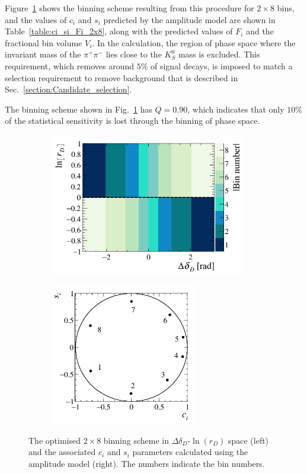 \documentclass[12pt, a4paper, notitlepage, onecolumn]{article}
\begin{document}
Figure~\ref{figure:Binning_scheme_plot_8bins} shows the binning scheme resulting from this procedure for $2 \times 8$ bins, and the values of $c_i$ and $s_i$ predicted by the amplitude model are shown in Table~\ref{table:ci_si_Fi_2x8}, along with the predicted values of $F_i$ and the fractional bin volume $V_i$. In the calculation, the region of phase space where the invariant mass of the $\pi^+\pi^-$ lies close to the $K^0_S$ mass is excluded. This requirement, which removes around $5\%$ of signal decays, is imposed to match a selection requirement to remove background that is described in Sec.~\ref{section:Candidate_selection}.

The binning scheme shown in Fig.~\ref{figure:Binning_scheme_plot_8bins} has $Q = 0.90$, which indicates that only $10\%$ of the statistical sensitivity is lost through the binning of phase space.

\begin{figure}[tb]
    \centering
    \begin{subfigure}{0.57\textwidth}
        \includegraphics[height=6.2cm]{Plots/BinningSchemePlot_8Bins.png}
        \caption{}
        \label{figure:Binning_scheme_plot_8bins}
    \end{subfigure}%
    \hfill
    \begin{subfigure}{0.43\textwidth}
        \includegraphics[height=6.2cm]{Plots/StrongPhaseParametersPlot_cisi_8Bins.png}
        \caption{}
        \label{figure:ci_si_2x8}
    \end{subfigure}
    \caption{The optimised $2\times 8$ binning scheme in $\Delta \delta_D$-$\ln(r_D)$ space (left) and the associated $c_i$ and $s_i$ parameters calculated using the amplitude  model (right). The numbers indicate the bin numbers.}
    \label{figure:Binning_scheme_plots_8bins}
\end{figure}
\end{document}
